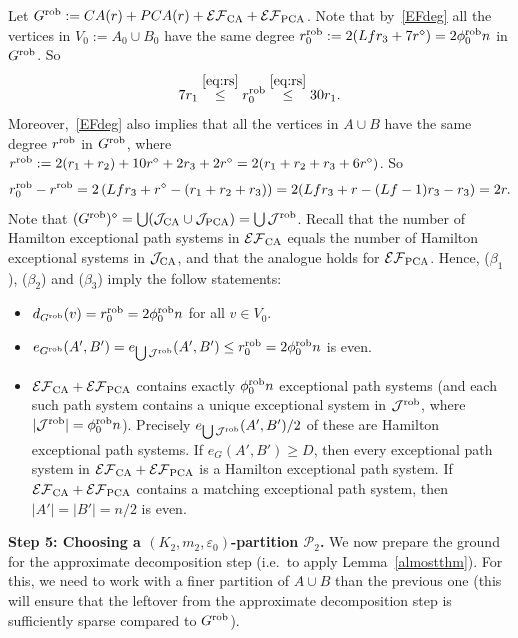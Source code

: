 \documentclass{memo-l}
\def\COMMENT#1{}
\def\cP{\mathcal{P}}
\def\eps{\varepsilon}
\def\cJ{\mathcal{J}}
\numberwithin{section}{chapter}
\numberwithin{equation}{section}
\numberwithin{firstthm}{section}
\numberwithin{figure}{section}
\begin{document}
{Let $G^{\rm rob}:=CA(r)+ PCA(r)+ \mathcal{EF}_{\rm CA}+ \mathcal{EF}_{\rm PCA}$.
Note that by~\eqref{EFdeg} all the vertices in $V_0:=A_0\cup B_0$ have the same degree  
$r_0^{\rm rob}:=2(Lfr_3+7r^\diamond) = 2 \phi^{\rm rob}_0 n $ in $G^{\rm rob}$.
So 
\begin{equation}\label{eq:rrob}
7r_1\stackrel{\eqref{eq:rs}}{\le} r_0^{\rm rob} \stackrel{\eqref{eq:rs}}{\le} 30r_1.
\end{equation}
Moreover,~\eqref{EFdeg} also implies that all the vertices in $A\cup B$ have the same degree $r^{\rm rob}$ in $G^{\rm rob}$,
where $r^{\rm rob} := 2(r_1+r_2)+10r^\diamond+2r_3+2r^\diamond=2(r_1+r_2+r_3+6r^\diamond)$. So 
$$
r_0^{\rm rob}-r^{\rm rob}=2 \left(Lfr_3+ r^\diamond- (r_1+r_2+r_3)\right)=2(Lfr_3+r-(Lf-1)r_3-r_3 )=2r.
$$
Note that $(G^{\rm rob})^{\diamond}=\bigcup(\mathcal{J}_{\rm CA} \cup \mathcal{J}_{\rm PCA})=\bigcup \cJ^{\rm rob}$.
Recall that the number of Hamilton exceptional path systems in $\mathcal{EF}_{\rm CA}$ equals the number of Hamilton exceptional
systems in $\mathcal{J}_{\rm CA}$, and that the analogue holds for $\mathcal{EF}_{\rm PCA}$.
Hence, ($\beta_1$), ($\beta_2$) and ($\beta_3$) imply the follow statements:%
   \COMMENT{Daniela: replaced $e_{\mathcal{J}^{\rm rob}}(A',B')$ by $e_{\bigcup\mathcal{J}^{\rm rob}}(A',B')$ in ($\beta_2'$)}
\begin{itemize}
    \item[($\beta_1'$)] $d_{G^{\rm rob}}(v) =r^{\rm rob}_0=2\phi_0^{\rm rob}n$ for all $v\in V_0$.
	\item[($\beta_2'$)] $e_{G^{\rm rob}}(A',B')=e_{\bigcup\mathcal{J}^{\rm rob}}(A',B')\le r^{\rm rob}_0 = 2\phi_0^{\rm rob}n$ is even.
	\item[($\beta_3'$)] $\mathcal{EF}_{\rm CA}+ \mathcal{EF}_{\rm PCA}$ contains exactly $\phi_0^{\rm rob}n$ 
exceptional path systems (and each such path system contains a unique exceptional system in 
$\mathcal{J}^{\rm rob}$, where $|\mathcal{J}^{\rm rob}|=\phi_0^{\rm rob}n$). Precisely $e_{\bigcup \mathcal{J}^{\rm rob}}(A',B')/2$ of these are
    Hamilton exceptional path systems. If $e_G(A',B') \ge D$, then every exceptional path system in $\mathcal{EF}_{\rm CA}+ \mathcal{EF}_{\rm PCA}$
    is a Hamilton exceptional path system.
    If $\mathcal{EF}_{\rm CA}+ \mathcal{EF}_{\rm PCA}$ contains a matching exceptional path system, then $|A'|=|B'|=n/2$ is even.
\end{itemize}

\smallskip

\noindent\textbf{Step 5: Choosing a $(K_2,m_2,\eps_0)$-partition $\cP_2$.}
We now prepare the ground for the approximate decomposition step (i.e.~to apply Lemma~\ref{almostthm}). 
For this, we need to work with a finer partition of $A \cup B$ than the previous one
(this will ensure that the leftover from the approximate decomposition step is sufficiently sparse compared to $G^{\rm rob}$).

}
\end{document}

